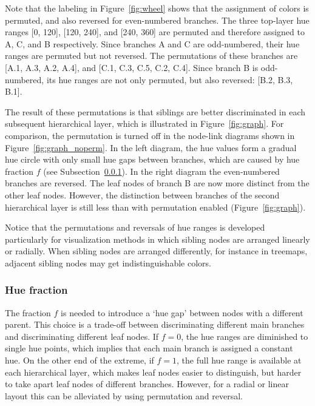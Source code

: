 \documentclass[journal]{vgtc}                %
\begin{document}
Note that the labeling in Figure~\ref{fig:wheel} shows that the assignment of colors is permuted, and also reversed for even-numbered branches. The three top-layer hue ranges [0, 120], [120, 240], and [240, 360] are permuted and therefore assigned to A, C, and B respectively. Since branches A and C are odd-numbered, their hue ranges are permuted but not reversed. The permutations of these branches are [A.1, A.3, A.2, A.4], and [C.1, C.3, C.5, C.2, C.4]. Since branch B is odd-numbered, its hue ranges are not only permuted, but also reversed: [B.2, B.3, B.1].

The result of these permutations is that siblings are better discriminated in each subsequent 
hierarchical layer, which is illustrated in Figure~\ref{fig:graph}. For comparison, the permutation 
is turned off in the node-link diagrams shown in Figure~\ref{fig:graph_noperm}. In the left diagram, the hue values 
form a gradual hue circle with only small hue gaps between branches, which are caused by hue fraction $f$ (see Subsection~\ref{secf}). In the right diagram the even-numbered branches are reversed. The leaf nodes of branch B are now more distinct from the other leaf nodes. However, the distinction between branches of the second hierarchical layer is still less than with permutation enabled (Figure~\ref{fig:graph}).




Notice that the permutations and reversals of hue ranges is developed particularly for visualization methods in which sibling nodes are arranged linearly or radially. When sibling nodes are arranged differently, for instance in treemaps, adjacent sibling nodes may get indistinguishable colors.

\subsubsection{Hue fraction}\label{secf}

The fraction $f$ is needed to introduce a `hue gap' between nodes with a different parent. This choice is a trade-off between discriminating different main branches and discriminating different leaf nodes. If $f=0$, the hue ranges are diminished to single hue points, which implies that each main branch is assigned a constant hue. On the other end of the extreme, if $f=1$, the full hue range is available at each hierarchical layer, which makes leaf nodes easier to distinguish, but harder to take apart leaf nodes of different branches. However, for a radial or linear layout this can be alleviated by using permutation and reversal.
\end{document}
